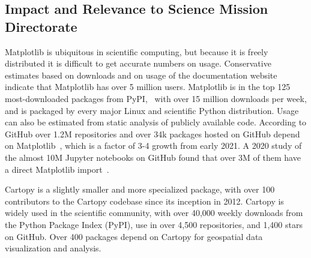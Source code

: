\documentclass[12pt]{article}
\numberwithin{page}{section}
\begin{document}


%
%
%





\subsection{Impact and Relevance to Science Mission Directorate}

Matplotlib is ubiquitous in scientific computing, but because it is freely
distributed it is difficult to get accurate numbers on usage.  Conservative
estimates based on downloads and on usage of the documentation website indicate
that Matplotlib has over 5 million users.  Matplotlib is in the top 125
most-downloaded packages from PyPI,~\cite{pypi_stats} with over 15 million
downloads per week, and is packaged by every major Linux and scientific Python
distribution.  Usage can also be estimated from static analysis of publicly
available code.  According to GitHub over 1.2M repositories and over 34k
packages hosted on GitHub depend on Matplotlib~\cite{gh_deps:2024},  which is a
factor of 3-4 growth from early 2021. A 2020 study of the almost 10M Jupyter
notebooks on GitHub found that over 3M of them have a direct Matplotlib
import~\cite{datalore:2020}.

Cartopy is a slightly smaller and more specialized package, with over 100 contributors
to the Cartopy codebase since its inception in 2012. Cartopy is widely used in the
scientific community, with over 40,000 weekly downloads from the Python Package Index (PyPI),
use in over 4,500 repositories, and 1,400 stars on GitHub.
Over 400 packages depend on Cartopy for geospatial data visualization and analysis.
\end{document}
